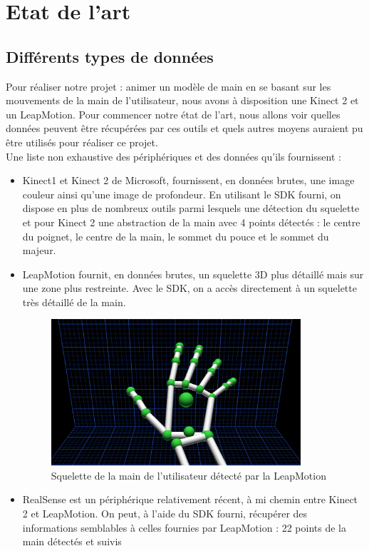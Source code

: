 \chapter{Etat de l'art}

\section{Différents types de données}
Pour réaliser notre projet : animer un modèle de main en se basant sur les mouvements de la main de l'utilisateur, nous avons à disposition une
Kinect 2 et un LeapMotion. Pour commencer notre état de l'art, nous allons voir quelles données peuvent être récupérées par ces outils et
quels autres moyens auraient pu être utilisés pour réaliser ce projet.\\

Une liste non exhaustive des périphériques et des données qu'ils fournissent :
\begin{itemize}
  \item Kinect1 et Kinect 2 de Microsoft, fournissent, en données brutes, une image couleur ainsi qu'une image de profondeur.
En utilisant le SDK fourni, on dispose en plus de nombreux outils parmi lesquels une détection du squelette et pour Kinect 2
une abstraction de la main avec 4 points détectés : le centre du poignet, le centre de la main, le sommet du pouce et le sommet du majeur.
  \item LeapMotion fournit, en données brutes, un squelette 3D plus détaillé mais sur une zone
plus restreinte. Avec le SDK, on a accès directement à un squelette très détaillé de la main.
    \begin{figure}[!h]
    \center
    \includegraphics[width=350px]{images/SDK_LeapMotion.png}
    \caption{Squelette de la main de l'utilisateur détecté par la LeapMotion}
    \end{figure}
  \item RealSense est un périphérique relativement récent, à mi chemin entre Kinect 2 et LeapMotion. On peut, à l'aide du SDK fourni, récupérer des informations semblables à celles fournies par LeapMotion :
  22 points de la main détectés et suivis
\end{itemize}
\ \\

